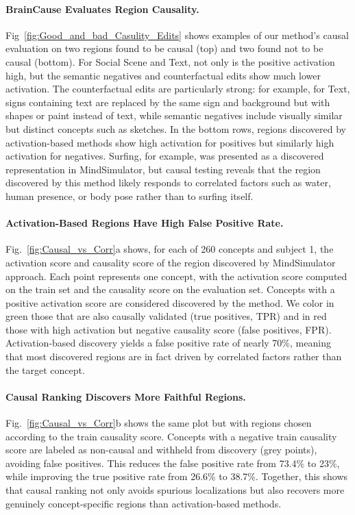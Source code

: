 \documentclass{llmxive}
\begin{document}
\vspace{-0.15cm}
\paragraph{BrainCause Evaluates Region Causality.}
Fig~\ref{fig:Good_and_bad_Casulity_Edits} shows examples of our method's causal evaluation on two regions found to be causal (top) and two found not to be causal (bottom). For Social Scene and Text, not only is the positive activation high, but the semantic negatives and counterfactual edits show much lower activation. The counterfactual edits are particularly strong: for example, for Text, signs containing text are replaced by the same sign and background but with shapes or paint instead of text, while semantic negatives include visually similar but distinct concepts such as sketches. In the bottom rows, regions discovered by activation-based methods show high activation for positives but similarly high activation for negatives. Surfing, for example, was presented as a discovered representation in MindSimulator, but causal testing reveals that the region discovered by this method likely responds to correlated factors such as water, human presence, or body pose rather than to surfing itself.

\vspace{-0.15cm}
\paragraph{Activation-Based Regions Have High False Positive Rate.}
Fig.~\ref{fig:Causal_vs_Corr}a shows, for each of 260 concepts and subject 1, the activation score and causality score of the region discovered by MindSimulator approach. Each point represents one concept, with the activation score computed on the train set and the causality score on the evaluation set. Concepts with a positive activation score are considered discovered by the method. We color in green those that are also causally validated (true positives, TPR) and in red those with high activation but negative causality score (false positives, FPR). Activation-based discovery yields a false positive rate of nearly 70\%, meaning that most discovered regions are in fact driven by correlated factors rather than the target concept.

\vspace{-0.15cm}
\paragraph{Causal Ranking Discovers More Faithful Regions.}
Fig.~\ref{fig:Causal_vs_Corr}b shows the same plot but with regions chosen according to the train causality score. Concepts with a negative train causality score are labeled as non-causal and withheld from discovery (grey points), avoiding false positives. This reduces the false positive rate from 73.4\% to 23\%, while improving the true positive rate from 26.6\% to 38.7\%. Together, this shows that causal ranking not only avoids spurious localizations but also recovers more genuinely concept-specific regions than activation-based methods.
\end{document}
